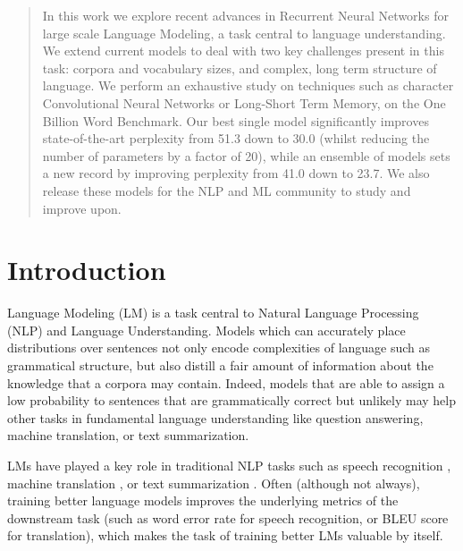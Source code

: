 \documentclass{article}
\begin{document}
 


\begin{abstract} 
In this work we explore recent advances in Recurrent Neural Networks for large scale Language Modeling, a task central to language understanding. We extend current models to deal with two key challenges present in this task: corpora and vocabulary sizes, and complex, long term structure of language. We perform an exhaustive study on techniques such as character Convolutional Neural Networks or Long-Short Term Memory, on the One Billion Word Benchmark. Our best single model significantly improves state-of-the-art perplexity from 51.3 down to 30.0 (whilst reducing the number of parameters by a factor of 20), while an ensemble of models sets a new record by improving perplexity from 41.0 down to 23.7. We also release these models for the NLP and ML community to study and improve upon.
\end{abstract} 
 \section{Introduction}
\label{intro}

Language Modeling (LM) is a task central to Natural Language Processing (NLP) and Language Understanding. Models which can accurately place distributions over sentences not only encode complexities of language such as grammatical structure, but also distill a fair amount of information about the knowledge that a corpora may contain. Indeed, models that are able to assign a low probability to sentences that are grammatically correct but unlikely may help other tasks in fundamental language understanding like question answering, machine translation, or text summarization.

LMs have played a key role in traditional NLP tasks such as speech recognition \cite{mikolov2010recurrent, arisoy2012deep}, machine translation \cite{schwenk2012large, vaswani2013decoding}, or text summarization \cite{rush2015neural,filippova2015sentence}. Often (although not always), training better language models improves the underlying metrics of the downstream task (such as word error rate for speech recognition, or BLEU score for translation), which makes the task of training better LMs valuable by itself.
\end{document}
